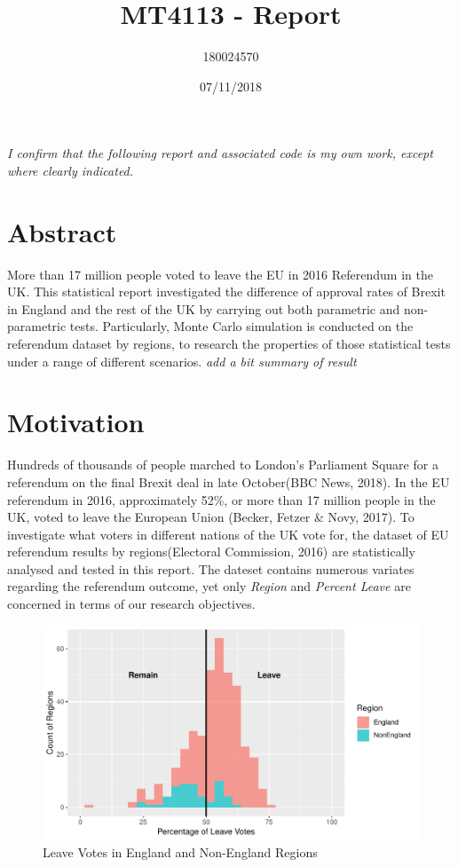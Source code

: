 \documentclass[]{article}
\title{MT4113 - Report}
\author{180024570}
\date{07/11/2018}
\begin{document}
\maketitle

\emph{I conﬁrm that the following report and associated code is my own
work, except where clearly indicated.}

\newpage

\section*{\centering Abstract}

More than 17 million people voted to leave the EU in 2016 Referendum in
the UK. This statistical report investigated the difference of approval
rates of Brexit in England and the rest of the UK by carrying out both
parametric and non-parametric tests. Particularly, Monte Carlo
simulation is conducted on the referendum dataset by regions, to
research the properties of those statistical tests under a range of
different scenarios. \emph{add a bit summary of result}

\newpage

\hypertarget{motivation}{%
\section{Motivation}\label{motivation}}

Hundreds of thousands of people marched to London's Parliament Square
for a referendum on the final Brexit deal in late October(BBC News,
2018). In the EU referendum in 2016, approximately 52\%, or more than 17
million people in the UK, voted to leave the European Union (Becker,
Fetzer \& Novy, 2017). To investigate what voters in different nations
of the UK vote for, the dataset of EU referendum results by
regions(Electoral Commission, 2016) are statistically analysed and
tested in this report. The dateset contains numerous variates regarding
the referendum outcome, yet only \emph{Region} and \emph{Percent Leave}
are concerned in terms of our research objectives.

\begin{figure}
\centering
\includegraphics{../figure/datasetHist.pdf}
\caption{Leave Votes in England and Non-England Regions}
\end{figure}
\end{document}
